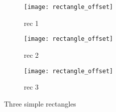 \begin{figure}
    \centering
    \begin{subfigure}[b]{0.3\textwidth}
        \centering
        \texttt{[image: rectangle\_offset]}
        \caption{rec 1}
        \label{fig: rectangle1}
    \end{subfigure}
    \hfill
    \begin{subfigure}[b]{0.3\textwidth}
        \centering
        \texttt{[image: rectangle\_offset]}
        \caption{rec 2}
        \label{fig: rectangle2}
    \end{subfigure}
    \hfill
    \begin{subfigure}[b]{0.3\textwidth}
        \centering
        \texttt{[image: rectangle\_offset]}
        \caption{rec 3}
        \label{fig: rectangle3}
    \end{subfigure}
    \caption{Three simple rectangles}
    \label{fig:3rectangles}
\end{figure}

